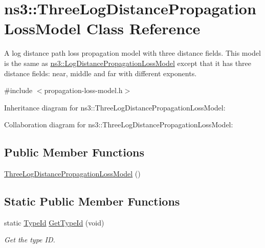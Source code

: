 \hypertarget{classns3_1_1ThreeLogDistancePropagationLossModel}{}\section{ns3\+:\+:Three\+Log\+Distance\+Propagation\+Loss\+Model Class Reference}
\label{classns3_1_1ThreeLogDistancePropagationLossModel}


A log distance path loss propagation model with three distance fields. This model is the same as \hyperlink{classns3_1_1LogDistancePropagationLossModel}{ns3\+::\+Log\+Distance\+Propagation\+Loss\+Model} except that it has three distance fields\+: near, middle and far with different exponents.  




{\ttfamily \#include $<$propagation-\/loss-\/model.\+h$>$}



Inheritance diagram for ns3\+:\+:Three\+Log\+Distance\+Propagation\+Loss\+Model\+:


Collaboration diagram for ns3\+:\+:Three\+Log\+Distance\+Propagation\+Loss\+Model\+:
\subsection*{Public Member Functions}
\begin{DoxyCompactItemize}
\item 
\hyperlink{classns3_1_1ThreeLogDistancePropagationLossModel_a87c77346b3e44d1b38888c2b10fa3eaf}{Three\+Log\+Distance\+Propagation\+Loss\+Model} ()
\end{DoxyCompactItemize}
\subsection*{Static Public Member Functions}
\begin{DoxyCompactItemize}
\item 
static \hyperlink{classns3_1_1TypeId}{Type\+Id} \hyperlink{classns3_1_1ThreeLogDistancePropagationLossModel_a7ff916722831ee6b581a69c95c5f8eab}{Get\+Type\+Id} (void)
\begin{DoxyCompactList}\small\item\em Get the type ID. \end{DoxyCompactList}\end{DoxyCompactItemize}
